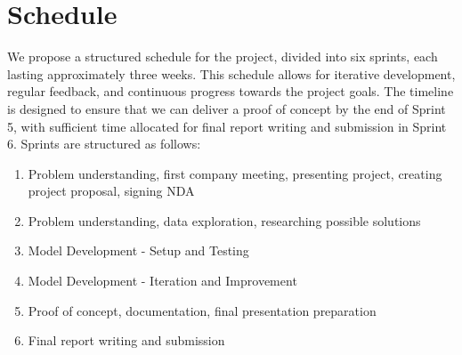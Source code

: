 \section{Schedule}

We propose a structured schedule for the project, divided into six sprints, each lasting approximately three weeks. 
This schedule allows for iterative development, regular feedback, and continuous progress towards the project goals. 
The timeline is designed to ensure that we can deliver a proof of concept by the end of Sprint 5, with sufficient time allocated for final report writing and submission in Sprint 6.
Sprints are structured as follows:

\begin{enumerate}
    \item Problem understanding, first company meeting, presenting project, creating project proposal, signing NDA
    \item Problem understanding, data exploration, researching possible solutions
    \item Model Development - Setup and Testing
    \item Model Development - Iteration and Improvement
    \item Proof of concept, documentation, final presentation preparation
    \item Final report writing and submission
\end{enumerate}




